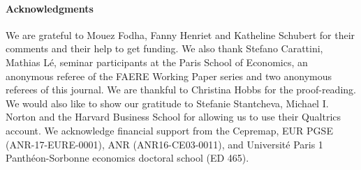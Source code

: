 \documentclass[english,5p,authoryear]{elsarticle}
\begin{document}
\paragraph*{Acknowledgments} We are grateful to Mouez Fodha, Fanny Henriet and Katheline Schubert for their comments and their help to get funding. We also thank Stefano Carattini, Mathias Lé, seminar participants at the Paris School of Economics, an anonymous referee of the FAERE Working Paper series and two anonymous referees of this journal. We are thankful to Christina Hobbs for the proof-reading. We would also like to show our gratitude to Stefanie Stantcheva, Michael I. Norton and the Harvard Business School for allowing us to use their Qualtrics account. We acknowledge financial support from the Cepremap, EUR PGSE (ANR-17-EURE-0001), ANR (ANR16-CE03-0011), and Université Paris 1 Panthéon-Sorbonne economics doctoral school (ED 465).


\newpage



\end{document}
